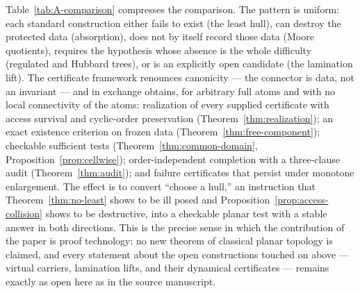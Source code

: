 \documentclass[11pt,reqno]{amsart}
\theoremstyle{definition}
\theoremstyle{remark}
\begin{document}
Table~\ref{tab:A-comparison} compresses the comparison.  The pattern is
uniform: each standard construction either fails to exist (the least
hull), can destroy the protected data (absorption), does not by itself
record those data (Moore quotients),
requires the hypothesis whose absence is the whole difficulty (regulated
and Hubbard trees), or is an explicitly open candidate (the lamination
lift).  The certificate framework renounces canonicity --- the connector
is data, not an invariant --- and in exchange obtains, for arbitrary
full atoms and with no local connectivity of the atoms: realization of every
supplied certificate with
access survival and cyclic-order preservation
(Theorem~\ref{thm:realization}); an exact existence criterion on frozen
data (Theorem~\ref{thm:free-component}); checkable sufficient tests
(Theorem~\ref{thm:common-domain}, Proposition~\ref{prop:cellwise});
order-independent completion with a three-clause audit
(Theorem~\ref{thm:audit}); and failure certificates that persist under
monotone enlargement.  The effect is to convert ``choose a hull,''
an instruction that Theorem~\ref{thm:no-least} shows to be ill posed and
Proposition~\ref{prop:access-collision} shows to be destructive, into a
checkable planar test with a stable answer in both directions.  This is
the precise sense in which the contribution of the paper is proof
technology: no new theorem of classical planar topology is claimed, and
every statement about the open constructions touched on above ---
virtual carriers, lamination lifts, and their dynamical certificates ---
remains exactly as open here as in the source manuscript.
\end{document}
